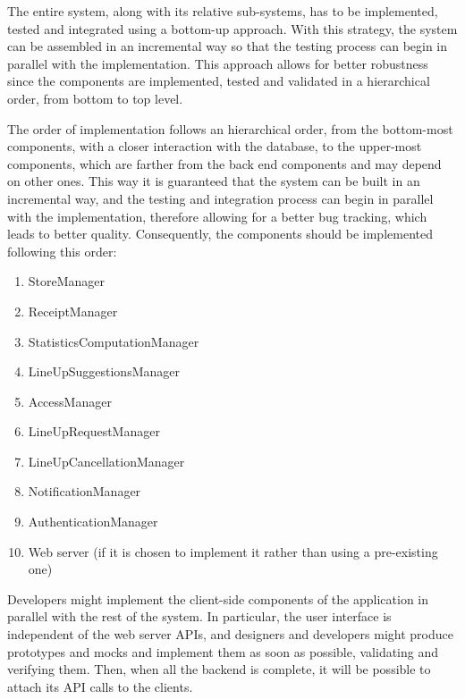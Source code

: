 \documentclass[../../main.tex]{subfiles}
\begin{document}
The entire system, along with its relative sub-systems, has to be implemented, tested and integrated using a bottom-up approach. 
With this strategy, the system can be assembled in an incremental way so that the testing process can begin in parallel with the implementation. 
This approach allows for better robustness since the components are implemented, tested and validated in a hierarchical order, from bottom to top level.


The order of implementation follows an hierarchical order, from the bottom-most components, with a closer interaction with the database, to the upper-most components, which are farther from the back end components and may depend on other ones. 
This way it is guaranteed that the system can be built in an incremental way, and the testing and integration process can begin in parallel with the implementation, therefore allowing for a better bug tracking, which leads to better quality. 
Consequently, the components should be implemented following this order:

\begin{enumerate}

	\item StoreManager
	\item ReceiptManager
	\item StatisticsComputationManager
	\item LineUpSuggestionsManager
	\item AccessManager
	\item LineUpRequestManager
	\item LineUpCancellationManager
	\item NotificationManager
	\item AuthenticationManager
	\item Web server (if it is chosen to implement it rather than using a pre-existing one)

\end{enumerate}

Developers might implement the client-side components of the application in parallel with the rest of the system. 
In particular, the user interface is independent of the web server APIs, and designers and developers might produce prototypes and mocks and implement them as soon as possible, validating and verifying them. Then, when all the backend is complete, it will be possible to attach its API calls to the clients.
\end{document}
